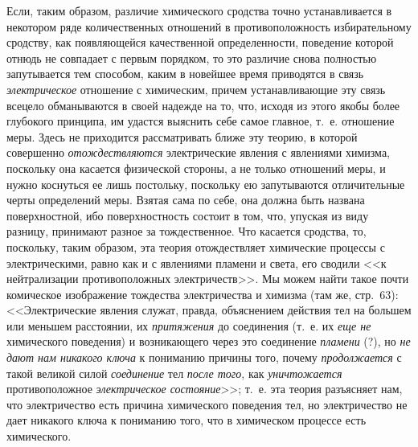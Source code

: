 Если, таким образом, различие химического сродства точно устанавливается в
некотором ряде количественных отношений в противоположность избирательному
сродству, как появляющейся качественной
определенности,
поведение которой отнюдь не совпадает с первым порядком, то это различие
снова полностью запутывается тем способом, каким в новейшее
время
приводятся в связь {\em электрическое} отношение с
химическим, причем устанавливающие эту связь всецело обманываются в своей
надежде на то, что, исходя из этого якобы более глубокого принципа, им
удастся выяснить себе самое главное, т.~е. отношение меры. Здесь не
приходится рассматривать ближе эту теорию, в которой совершенно
{\em отождествляются} электрические явления с явлениями
химизма, поскольку она касается физической стороны, а не только отношений
меры, и нужно коснуться ее лишь постольку, поскольку ею запутываются
отличительные черты определений меры. Взятая сама по себе, она должна быть
названа поверхностной, ибо поверхностность состоит в том, что, упуская из
виду разницу, принимают разное за тождественное. Что касается сродства, то,
поскольку, таким образом, эта теория отождествляет химические процессы с
электрическими, равно как и с явлениями пламени и света, его сводили <<к
нейтрализации противоположных электричеств>>. Мы можем найти такое почти
комическое изображение тождества электричества и химизма (там же, стр.~63):
<<Электрические явления служат, правда, объяснением действия тел на большем
или меньшем расстоянии, их {\em притяжения} до
соединения (т.~е. их {\em еще не} химического
поведения) и возникающего через это соединение
{\em пламени} (?), но {\em не дают
нам никакого ключа} к пониманию причины того, почему
{\em продолжается} с такой великой силой
{\em соединение} тел {\em после
того}, как {\em уничтожается} противоположное
{\em электрическое состояние}>>; т.~е. эта теория
разъясняет нам, что электричество есть причина химического поведения тел,
но электричество не дает никакого ключа к пониманию того, что в химическом
процессе есть химического.

